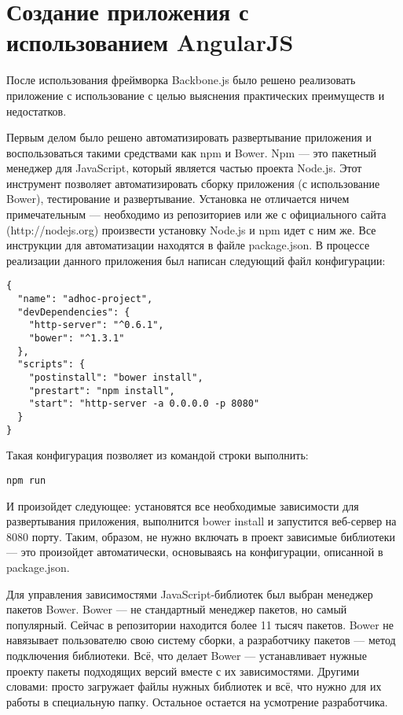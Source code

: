 \section{Создание приложения с использованием AngularJS}

После использования фреймворка Backbone.js было решено реализовать приложение с использование с целью выяснения практических преимуществ и недостатков.

Первым делом было решено автоматизировать развертывание приложения и воспользоваться такими средствами как npm и Bower. Npm --- это пакетный менеджер для JavaScript, который является частью проекта Node.js. Этот инструмент позволяет автоматизировать сборку приложения (с использование Bower), тестирование и развертывание. Установка не отличается ничем примечательным --- необходимо из репозиториев или же с официального сайта (http://nodejs.org) произвести установку Node.js и npm идет с ним же\cite{npm}. Все инструкции для автоматизации находятся в файле package.json. В процессе реализации данного приложения был написан следующий файл конфигурации:
\begin{lstlisting}[basicstyle=\normalsize]
{
  "name": "adhoc-project",
  "devDependencies": {
    "http-server": "^0.6.1",
    "bower": "^1.3.1"
  },
  "scripts": {
    "postinstall": "bower install",
    "prestart": "npm install",
    "start": "http-server -a 0.0.0.0 -p 8080"
  }
}
\end{lstlisting}

Такая конфигурация позволяет из командой строки выполнить:
\begin{lstlisting}
npm run
\end{lstlisting}

И произойдет следующее: установятся все необходимые зависимости для развертывания приложения, выполнится bower install и запустится веб-сервер на 8080 порту. Таким, образом, не нужно включать в проект зависимые библиотеки --- это произойдет автоматически, основываясь на конфигурации, описанной в package.json.

Для управления зависимостями JavaScript-библиотек был выбран менеджер пакетов Bower. Bower --- не стандартный менеджер пакетов, но самый популярный. Сейчас в репозитории находится более 11 тысяч пакетов\cite{bower}. Bower не навязывает пользователю свою систему сборки, а разработчику пакетов --- метод подключения библиотеки. Всё, что делает Bower --- устанавливает нужные проекту пакеты подходящих версий вместе с их зависимостями. Другими словами: просто загружает файлы нужных библиотек и всё, что нужно для их работы в специальную папку. Остальное остается на усмотрение разработчика.

